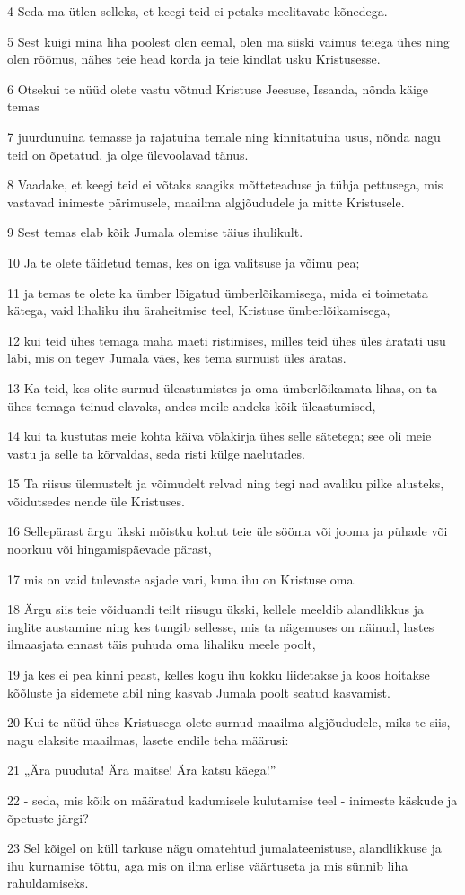\par 4 Seda ma ütlen selleks, et keegi teid ei petaks meelitavate kõnedega.
\par 5 Sest kuigi mina liha poolest olen eemal, olen ma siiski vaimus teiega ühes ning olen rõõmus, nähes teie head korda ja teie kindlat usku Kristusesse.
\par 6 Otsekui te nüüd olete vastu võtnud Kristuse Jeesuse, Issanda, nõnda käige temas
\par 7 juurdunuina temasse ja rajatuina temale ning kinnitatuina usus, nõnda nagu teid on õpetatud, ja olge ülevoolavad tänus.
\par 8 Vaadake, et keegi teid ei võtaks saagiks mõtteteaduse ja tühja pettusega, mis vastavad inimeste pärimusele, maailma algjõududele ja mitte Kristusele.
\par 9 Sest temas elab kõik Jumala olemise täius ihulikult.
\par 10 Ja te olete täidetud temas, kes on iga valitsuse ja võimu pea;
\par 11 ja temas te olete ka ümber lõigatud ümberlõikamisega, mida ei toimetata kätega, vaid lihaliku ihu äraheitmise teel, Kristuse ümberlõikamisega,
\par 12 kui teid ühes temaga maha maeti ristimises, milles teid ühes üles äratati usu läbi, mis on tegev Jumala väes, kes tema surnuist üles äratas.
\par 13 Ka teid, kes olite surnud üleastumistes ja oma ümberlõikamata lihas, on ta ühes temaga teinud elavaks, andes meile andeks kõik üleastumised,
\par 14 kui ta kustutas meie kohta käiva võlakirja ühes selle sätetega; see oli meie vastu ja selle ta kõrvaldas, seda risti külge naelutades.
\par 15 Ta riisus ülemustelt ja võimudelt relvad ning tegi nad avaliku pilke alusteks, võidutsedes nende üle Kristuses.
\par 16 Sellepärast ärgu ükski mõistku kohut teie üle sööma või jooma ja pühade või noorkuu või hingamispäevade pärast,
\par 17 mis on vaid tulevaste asjade vari, kuna ihu on Kristuse oma.
\par 18 Ärgu siis teie võiduandi teilt riisugu ükski, kellele meeldib alandlikkus ja inglite austamine ning kes tungib sellesse, mis ta nägemuses on näinud, lastes ilmaasjata ennast täis puhuda oma lihaliku meele poolt,
\par 19 ja kes ei pea kinni peast, kelles kogu ihu kokku liidetakse ja koos hoitakse kõõluste ja sidemete abil ning kasvab Jumala poolt seatud kasvamist.
\par 20 Kui te nüüd ühes Kristusega olete surnud maailma algjõududele, miks te siis, nagu elaksite maailmas, lasete endile teha määrusi:
\par 21 „Ära puuduta! Ära maitse! Ära katsu käega!”
\par 22 - seda, mis kõik on määratud kadumisele kulutamise teel - inimeste käskude ja õpetuste järgi?
\par 23 Sel kõigel on küll tarkuse nägu omatehtud jumalateenistuse, alandlikkuse ja ihu kurnamise tõttu, aga mis on ilma erlise väärtuseta ja mis sünnib liha rahuldamiseks.


